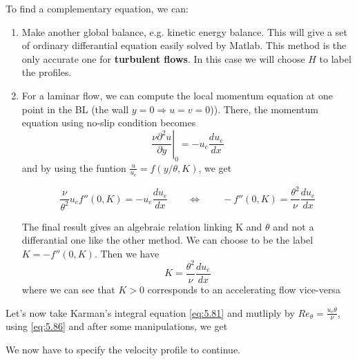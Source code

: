 To find a complementary equation, we can:
\begin{enumerate}
\item Make another global balance, e.g. kinetic energy balance. This will give a set of ordinary differantial equation easily solved by Matlab. This method is the only accurate one for \textbf{turbulent flows}. In this case we will choose $H$ to label the profiles. 

\item For a laminar flow, we can compute the local momentum equation at one point in the BL (the wall $y=0 \Rightarrow u=v=0$)). There, the momentum equation using no-slip condition becomes 
\begin{equation}
	\left.\frac{\nu  \partial^2 u}{\partial y}\right|_0=-u_e\frac{du_e}{dx}
\end{equation}
and by using the funtion $\frac{u}{u_e} = f(y/\theta , K)$, we get

\begin{equation}
 \frac{\nu}{\theta^2}u_e f''(0,K) =-u_e \frac{d u_e}{d x}\qquad  \Leftrightarrow \qquad  -f''(0,K)=\frac{\theta^2}{\nu} \frac{d u_e}{d x}
\end{equation}

The final result gives an algebraic relation linking K and $\theta$ and not a differantial one like the other method. We can choose to be the label $K=-f''(0,K) $. Then we have 
\begin{equation}
K=\frac{\theta^2}{\nu} \frac{d u_e}{d x}
\end{equation} 
where we can see that $K>0$ corresponds to an accelerating flow vice-versa
\end{enumerate}

Let's now take Karman's integral equation \eqref{eq:5.81} and mutliply by $Re_{ \theta}=\frac{u_e \theta}{\nu}$, using \eqref{eq:5.86} and after some manipulations, we get

\begin{center}
\end{center}

We now have to specify the velocity profile to continue.


